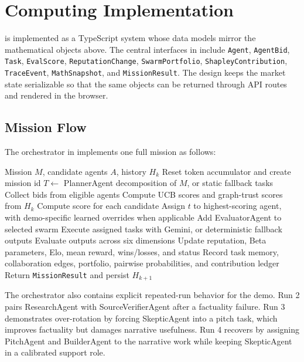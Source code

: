 \section{Computing Implementation}

\systemname{} is implemented as a TypeScript system whose data models mirror the mathematical objects above. The central interfaces in  include \texttt{Agent}, \texttt{AgentBid}, \texttt{Task}, \texttt{EvalScore}, \texttt{ReputationChange}, \texttt{SwarmPortfolio}, \texttt{ShapleyContribution}, \texttt{TraceEvent}, \texttt{MathSnapshot}, and \texttt{MissionResult}. The design keeps the market state serializable so that the same objects can be returned through API routes and rendered in the browser.

\subsection{Mission Flow}

The orchestrator in  implements one full mission as follows:

\begin{algorithm}[t]
\caption{\systemname{} mission execution}
\label{alg:mission}
\begin{algorithmic}[1]
\Require Mission \(M\), candidate agents \(A\), history \(H_k\)
\State Reset token accumulator and create mission id
\State \(T \gets\) PlannerAgent decomposition of \(M\), or static fallback tasks
  \State Collect bids from eligible agents
  \State Compute UCB scores and graph-trust scores from \(H_k\)
  \State Compute \marketmaker{} score for each candidate
  \State Assign \(t\) to highest-scoring agent, with demo-specific learned overrides when applicable
\EndFor
\State Add EvaluatorAgent to selected swarm
\State Execute assigned tasks with Gemini, or deterministic fallback outputs
\State Evaluate outputs across six dimensions
\State Update reputation, Beta parameters, Elo, mean reward, wins/losses, and status
\State Record task memory, collaboration edges, portfolio, pairwise probabilities, and contribution ledger
\State Return \texttt{MissionResult} and persist \(H_{k+1}\)
\end{algorithmic}
\end{algorithm}

The orchestrator also contains explicit repeated-run behavior for the demo. Run 2 pairs ResearchAgent with SourceVerifierAgent after a factuality failure. Run 3 demonstrates over-rotation by forcing SkepticAgent into a pitch task, which improves factuality but damages narrative usefulness. Run 4 recovers by assigning PitchAgent and BuilderAgent to the narrative work while keeping SkepticAgent in a calibrated support role.

